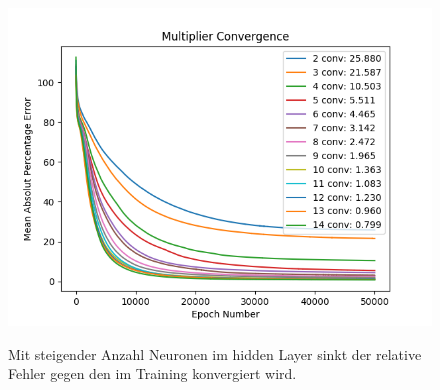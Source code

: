 \begin{figure}
	\centering
	\includegraphics[scale=0.7]{learning/img/loss.png}
	\label{fig:mst_loss}
	\caption{Mit steigender Anzahl Neuronen im hidden Layer sinkt der relative Fehler gegen den im Training konvergiert wird.}
\end{figure}


